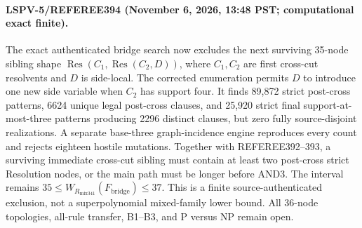 \paragraph{LSPV-5/REFEREE394 (November 6, 2026, 13:48 PST; computational exact finite).}
The exact authenticated bridge search now excludes the next surviving 35-node sibling shape $\operatorname{Res}(C_1,\operatorname{Res}(C_2,D))$, where $C_1,C_2$ are first cross-cut resolvents and $D$ is side-local.  The corrected enumeration permits $D$ to introduce one new side variable when $C_2$ has support four.  It finds 89,872 strict post-cross patterns, 6624 unique legal post-cross clauses, and 25,920 strict final support-at-most-three patterns producing 2296 distinct clauses, but zero fully source-disjoint realizations.  A separate base-three graph-incidence engine reproduces every count and rejects eighteen hostile mutations.  Together with REFEREE392--393, a surviving immediate cross-cut sibling must contain at least two post-cross strict Resolution nodes, or the main path must be longer before AND3.  The interval remains $35\le W_{R_{\mathrm{mix341}}}(F_{\mathrm{bridge}})\le37$.  This is a finite source-authenticated exclusion, not a superpolynomial mixed-family lower bound.  All 36-node topologies, all-rule transfer, B1--B3, and P versus NP remain open.
